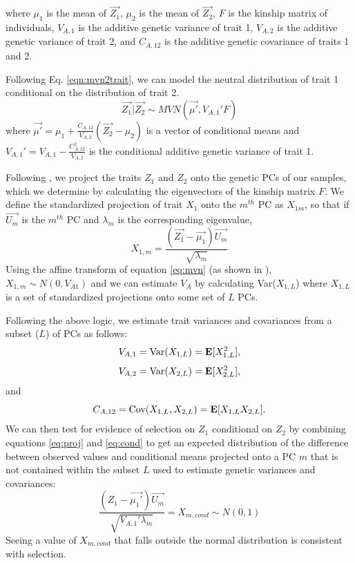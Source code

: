 \documentclass[11pt,letterpaper]{article}
\begin{document}
where $\mu_{1}$ is the mean of $\vec{Z_{1}}$, $\mu_{2}$ is the mean of $\vec{Z_{2}}$, $F$ is the kinship matrix of individuals, $V_{A,1}$ is the additive genetic variance of trait 1, $V_{A,2}$ is the additive genetic variance of trait 2, and $C_{A,12}$ is the additive genetic covariance of traits 1 and 2.

Following Eq. \ref{eqn:mvn2trait}, we can model the neutral distribution of trait 1 conditional on the distribution of trait 2.
\begin{equation}\label{eq:cond}
\vec{Z_{1}}|\vec{Z_{2}} \sim MVN(\vec{\mu'}, V_{A,1}'F)
\end{equation}
where $\vec{\mu'}  = \mu_{1} + \frac{C_{A,12}}{V_{A,2}}(\vec{Z_{2}} - \mu_{2}) $ is a vector of conditional means and $V_{A,1}' =  V_{A,1} - \frac{C_{A,12}^{2}}{V_{A, 2}}$ is the conditional additive genetic variance of trait 1.

Following \cite{Josephs2019}, we project the traits $Z_{1}$ and $Z_{2}$ onto the genetic PCs of our samples, which we determine by calculating the eigenvectors of the kinship matrix $F$.
We define the standardized projection of trait $X_{1}$ onto the $m^{th}$ PC as $X_{1m}$, so that if $\vec{U_m}$ is the $m^{th}$ PC and $\lambda_{m}$ is the corresponding eigenvalue,
\begin{equation}\label{eq:proj}
X_{1,m} = \frac{(\vec{Z_{1}}-\vec{\mu_{1}})\vec{U_{m}}}{\sqrt{\lambda_{m}}}
  \end{equation}
Using the affine transform of equation \ref{eq:mvn} (as shown in \cite{Josephs2019}), $X_{1,m} \sim N(0, V_{A1})$ and we can estimate $V_{A}$ by calculating Var($X_{1,L}$) where $X_{1,L}$ is a set of standardized projections onto some set of $L$ PCs. 

Following the above logic, we estimate trait variances and covariances from a subset ($L$) of PCs as follows:
\begin{equation}
V_{A,1} = \textnormal{Var}(X_{1,L}) = \textbf{E}[X_{1,L}^{2}],
  \end{equation}
\begin{equation}
V_{A,2} = \textnormal{Var}(X_{2,L}) = \textbf{E}[X_{2,L}^{2}],
\end{equation}
and
\begin{equation}
C_{A,12} = \textnormal{Cov}(X_{1,L}, X_{2,L}) = \textbf{E}[X_{1,L}X_{2,L}].
\end{equation}
We can then test for evidence of selection on $Z_{1}$ conditional on $Z_{2}$ by combining equations \ref{eq:proj} and \ref{eq:cond} to get an expected distribution of the difference between observed values and conditional means projected onto a PC $m$ that is not contained within the subset $L$ used to estimate genetic variances and covariances:
\begin{equation}
\frac{(Z_{1} - \vec{\mu_{1}'})\vec{U_{m}}}{\sqrt{V_{A,1}'\lambda_{m}}} = X_{m, cond} \sim N(0,1)
  \end{equation}
Seeing a value of $X_{m,cond}$ that falls outside the normal distribution is consistent with selection. 
\end{document}

